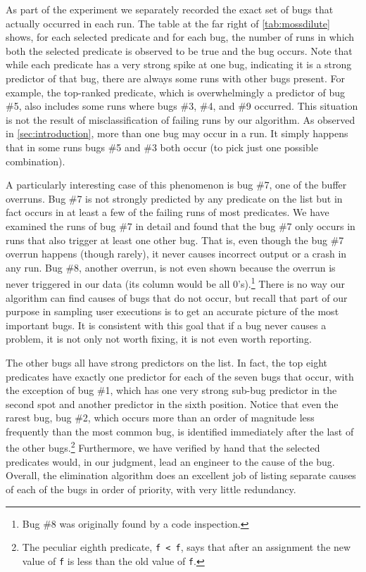 As part of the experiment we separately recorded the exact set of
bugs that actually occurred in each run.
The table at the far right of \autoref{tab:mossdilute} shows, for
each selected predicate and for each bug, the number of runs in which
both the selected predicate is observed to be true and the bug occurs.
Note that while each
predicate has a very strong spike at one bug, indicating it is a
strong predictor of that bug, there are always some runs with other
bugs present.  For example, the top-ranked predicate, which is
overwhelmingly a predictor of bug \#5, also includes some runs where
bugs \#3, \#4, and \#9 occurred.  This situation is not the result of
misclassification of failing runs by our algorithm.  As observed in
\autoref{sec:introduction}, more than one bug may occur in a run.
It simply happens that in some runs bugs \#5 and \#3 both occur (to
pick just one possible combination).

A particularly interesting case of this phenomenon is bug \#7, one of
the buffer overruns.  Bug \#7 is not strongly predicted by any
predicate on the list but in fact occurs in at least a few of the
failing runs of most predicates.  We have examined the runs of bug \#7
in detail and found that the bug \#7 only occurs in runs that also
trigger at least one other bug.  That is, even though the bug \#7 overrun
happens (though rarely), it never causes incorrect output or a crash
in any run.  Bug \#8, another overrun, is not even shown because the
overrun is never triggered in our data (its column would be all
0's).\footnote{Bug \#8 was originally found by a code inspection.}
There is no way our algorithm can find causes of bugs that do not
occur, but recall that part of our purpose in sampling user executions
is to get an accurate picture of the most important bugs.  It is
consistent with this goal that if a bug never causes a problem, it is
not only not worth fixing, it is not even worth reporting.

The other bugs all have strong predictors on the list.  In fact,
the top eight predicates have exactly one predictor for each of the seven
bugs that occur, with the exception of bug \#1, which has one very
strong sub-bug predictor in the second spot and another predictor
in the sixth position.  Notice that even the rarest bug, bug \#2,
which occurs more than an order of magnitude less frequently than
the most common bug, is identified immediately after the last of
the other bugs.\footnote{The peculiar eighth predicate, \texttt{f < f},
says that after an assignment the new value of {\tt f} is less than
the old value of {\tt f}.}  Furthermore, we have verified by hand that
the selected predicates would, in our judgment, lead an engineer to
the cause of the bug. Overall, the elimination algorithm does an excellent
job of listing separate causes of each of the bugs in order of priority,
with very little redundancy.

